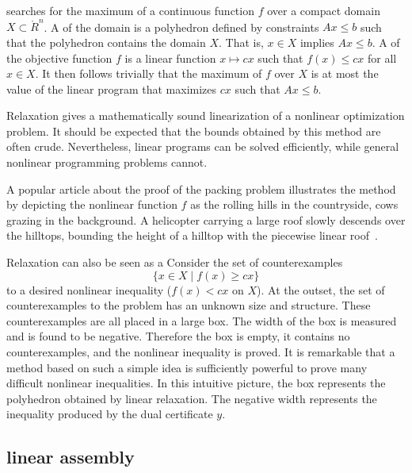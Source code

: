  searches for the maximum of a
continuous function $f$ over a compact domain $X\subset \ring{R}^n$.
A  of the domain is a polyhedron defined by
constraints $A x \le b$ such that the polyhedron contains the domain
$X$.  That is, $x\in X$ implies $A x \le b$.  A  of the objective function $f$ is a linear function
$x\mapsto c x$ such that $f(x) \le c x$ for all $x\in X$.  It then
follows trivially that the maximum of $f$ over $X$ is at most the
value of the linear program that maximizes $c x$ such that $A x \le
b$.

Relaxation gives a mathematically sound linearization of a
nonlinear optimization problem.  It should be expected that the bounds
obtained by this method are often  crude.  Nevertheless, linear
programs can be solved efficiently, while general nonlinear
programming problems cannot.

\begin{remark}[popularization]
A popular article about the proof of the packing problem
illustrates the method by depicting the nonlinear function $f$
as the rolling hills in the countryside, cows grazing in the background.  
A helicopter
carrying a large roof slowly
descends over the hilltops, bounding the height of a hilltop
with the piecewise linear roof~\cite{unknown}.
\end{remark}

\begin{remark}
Relaxation can also be seen as a   Consider the set of counterexamples
\[
\{x\in X\mid f(x)\ge c x\}
\]
to a desired nonlinear inequality ($f(x)< c x$ on $X$).  At the
outset, the set of counterexamples to the problem has an unknown size
and structure.  These counterexamples are all placed in a large box.
The width of the box is measured and is found to be negative.
Therefore the box is empty, it contains no counterexamples, and the
nonlinear inequality is proved.  It is remarkable that a method based
on such a simple idea is sufficiently powerful to prove many difficult
nonlinear inequalities.  In this intuitive picture, the box represents
the polyhedron obtained by linear relaxation.  The negative width
represents the inequality produced by the dual certificate $y$.
\end{remark}

\subsection{linear assembly}

